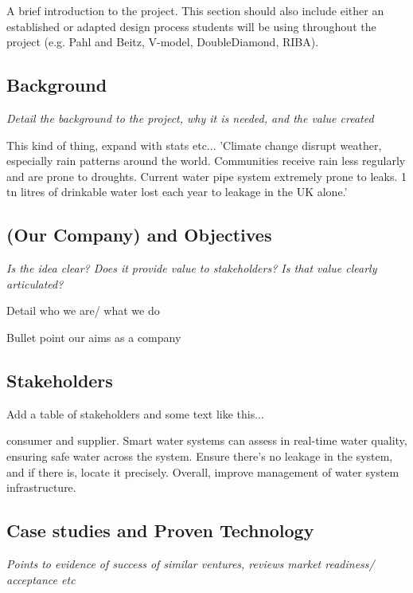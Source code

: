 A brief introduction to the project. This section should also include either an established or adapted design process students will be using throughout the project (e.g. Pahl and Beitz, V-model, DoubleDiamond, RIBA).

\subsection{Background}
\textit{Detail the background to the project, why it is needed, and the value created}

This kind of thing, expand with stats etc... 'Climate change disrupt weather, especially rain patterns around the world. Communities receive rain less regularly and are prone to droughts. Current water pipe system extremely prone to leaks. 1 tn litres of drinkable water lost each year to leakage in the UK alone.'

\subsection{(Our Company) and Objectives}
\textit{Is the idea clear?
Does it provide value to
stakeholders?
Is that value clearly
articulated?}

Detail who we are/ what we do 

Bullet point our aims as a company

\subsection{Stakeholders}
Add a table of stakeholders and some text like this...

consumer and supplier. Smart water systems can assess in real-time water quality, ensuring safe water across the system. Ensure there's no leakage in the system, and if there is, locate it precisely. Overall, improve management of water system infrastructure.

\subsection{Case studies and Proven Technology}
\textit{Points to evidence of success of similar ventures, reviews market readiness/ acceptance etc}




